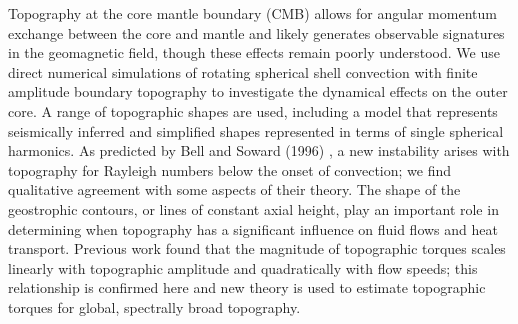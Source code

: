 \begin{chapterabstract}
Topography at the core mantle boundary (CMB) allows for angular momentum exchange between the core and mantle and likely generates observable signatures in the geomagnetic field, though these effects remain poorly understood. 
We use direct numerical simulations of rotating spherical shell convection with finite amplitude boundary topography to investigate the dynamical effects on the outer core.
A range of topographic shapes are used, including a model that represents seismically inferred  and simplified shapes represented in terms of single spherical harmonics. As predicted by Bell and Soward (1996) \citep{pB96}, a new instability arises with topography for Rayleigh numbers below the onset of convection; we find qualitative agreement with some aspects of their theory. The shape of the geostrophic contours, or lines of constant axial height, play an important role in determining when topography has a significant influence on fluid flows and heat transport. 
Previous work found that the magnitude of topographic torques scales linearly with topographic amplitude and quadratically with flow speeds; this relationship is confirmed here and new theory is used to estimate topographic torques for global, spectrally broad topography. 
\end{chapterabstract}









